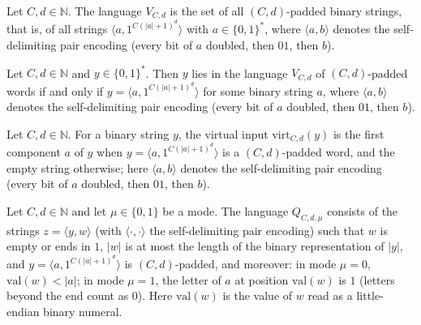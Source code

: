\begin{definition}
\label{Complexity.epadV}
\leanok
{}
Let $C, d \in \mathbb{N}$. The language $V_{C,d}$ is the set of all $(C,d)$-padded binary
strings, that is, of all strings $\langle a, 1^{C(|a|+1)^d}\rangle$ with $a \in \{0,1\}^*$,
where $\langle a,b\rangle$ denotes the self-delimiting pair encoding (every bit of $a$ doubled, then $01$, then $b$).
\end{definition}

\begin{lemma}
\label{Complexity.epad_mem_V}
\leanok
{}
Let $C, d \in \mathbb{N}$ and $y \in \{0,1\}^*$. Then $y$ lies in the language $V_{C,d}$ of
$(C,d)$-padded words if and only if $y = \langle a, 1^{C(|a|+1)^d}\rangle$ for some binary
string $a$, where $\langle a,b\rangle$ denotes the self-delimiting pair encoding (every bit of $a$ doubled, then $01$, then $b$).
\end{lemma}

\begin{definition}
\label{Complexity.epadVirt}
\leanok
{}
Let $C, d \in \mathbb{N}$. For a binary string $y$, the virtual input $\mathrm{virt}_{C,d}(y)$ is
the first component $a$ of $y$ when $y = \langle a, 1^{C(|a|+1)^d}\rangle$ is a
$(C,d)$-padded word, and the empty string otherwise; here $\langle a,b\rangle$ denotes the self-delimiting pair encoding (every bit of $a$ doubled, then $01$, then $b$).
\end{definition}

\begin{definition}
\label{Complexity.epadQ}
\leanok
{}
Let $C, d \in \mathbb{N}$ and let $\mu \in \{0,1\}$ be a mode. The language $Q_{C,d,\mu}$
consists of the strings $z = \langle y, w\rangle$ (with $\langle\cdot,\cdot\rangle$ the
self-delimiting pair encoding) such that $w$ is empty or ends in $1$, $|w|$ is at most the length
of the binary representation of $|y|$, and $y = \langle a, 1^{C(|a|+1)^d}\rangle$ is
$(C,d)$-padded, and moreover: in mode $\mu = 0$, $\mathrm{val}(w) < |a|$; in mode $\mu = 1$, the
letter of $a$ at position $\mathrm{val}(w)$ is $1$ (letters beyond the end count as $0$). Here
$\mathrm{val}(w)$ is the value of $w$ read as a little-endian binary numeral.
\end{definition}

